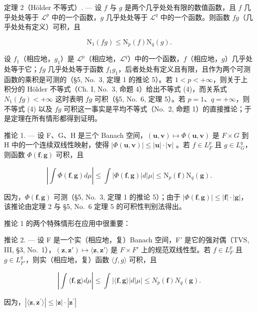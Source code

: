 定理 2（Hölder 不等式）. --- 设 \(f\) 与 \(g\) 是两个几乎处处有限的数值函数，且 \(f\) 几乎处处等于 \(\mathcal{L}^p\) 中的一个函数，\(g\) 几乎处处等于 \(\mathcal{L}^q\) 中的一个函数。则函数 \(fg\)（几乎处处有定义）可积，且

\[
\mathrm{N} _ {1} (f g) \leqslant \mathrm{N} _ {p} (f) \mathrm{N} _ {q} (g).\tag{4}
\]

设 \(f_{1}\)（相应地，\(g_{1}\)）是 \(\mathcal{L}^{p}\)（相应地，\(\mathcal{L}^{q}\)）中的一个函数，\(f\)（相应地，\(g\)）几乎处处等于它；\(fg\) 几乎处处等于函数 \(f_{1}g_{1}\)，后者处处有定义且有限，且作为两个可测函数的乘积是可测的（§5, No.~3, 定理 1 的推论 5）。若 \(1 < p < +\infty\)，则关于上积分的 Hölder 不等式（Ch. I, No.~3, 命题 4）给出不等式 (4)，而关系式 \(N_{1}(fg) < +\infty\) 这时表明 \(fg\) 可积（§5, No.~6, 定理 5）。若 \(p = 1\)、\(q = +\infty\)，则不等式 (4) 以及 \(fg\) 可积这一事实是平均不等式（No.~2, 命题 1）的直接推论；于是定理在所有情形都得到证明。

推论 1. --- 设 F、G、H 是三个 Banach 空间，\((\mathbf{u}, \mathbf{v}) \mapsto \Phi(\mathbf{u}, \mathbf{v})\) 是 \(F \times G\) 到 H 中的一个连续双线性映射，使得 \(|\Phi(\mathbf{u}, \mathbf{v})| \leqslant |\mathbf{u}| \cdot |\mathbf{v}|\) 。若 \(f \in L_{F}^{p}\) 且 \(g \in L_{G}^{q}\)，则函数 \(\Phi(\mathbf{f}, \mathbf{g})\) 可积，且

\[
\left| \int \Phi (\mathbf {f}, \mathbf {g}) d \mu \right| \leqslant \int | \Phi (\mathbf {f}, \mathbf {g}) | d | \mu | \leqslant \mathrm{N} _ {p} (\mathbf {f}) \mathrm{N} _ {q} (\mathbf {g}).\tag{5}
\]

因为，\(\Phi(\mathbf{f},\mathbf{g})\) 可测（§5, No.~3, 定理 1 的推论 5）；由于 \(|\Phi(\mathbf{f},\mathbf{g})| \leqslant |\mathbf{f}| \cdot |\mathbf{g}|\)，该推论由定理 2 与 §5, No.~6 定理 5 的可积性判别法得出。

推论 1 的两个特殊情形在应用中很重要：

推论 2. --- 设 F 是一个实（相应地，复）Banach 空间，F' 是它的强对偶（TVS, III, §3, No.~1），\((\mathbf{z}, \mathbf{z}') \mapsto \langle \mathbf{z}, \mathbf{z}' \rangle\) 是 \(F \times F'\) 上的规范双线性型。若 \(f \in L_{F}^{p}\) 且 \(g \in L_{F'}^{q}\)，则实（相应地，复）函数 \(\langle f, g \rangle\) 可积，且

\[
\left| \int \langle \mathbf {f}, \mathbf {g} \rangle d \mu \right| \leqslant \int | \langle \mathbf {f}, \mathbf {g} \rangle | d | \mu | \leqslant N _ {p} (\mathbf {f}) N _ {q} (\mathbf {g}).\tag{6}
\]

因为，\(|\langle \mathbf{z},\mathbf{z}^{\prime}\rangle |\leqslant |\mathbf{z}|\cdot |\mathbf{z}^{\prime}|\)

